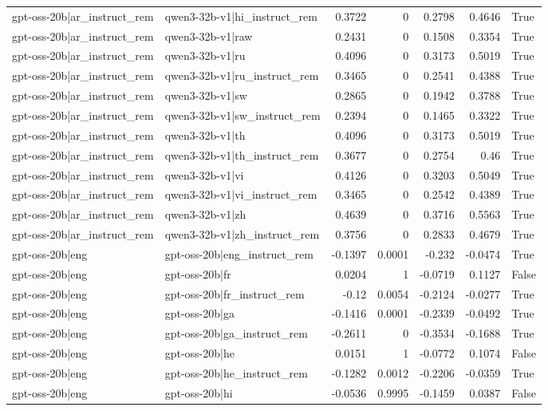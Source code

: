\begin{table}
\begin{tabular}{l l r r r r l}
gpt-oss-20b|ar_instruct_rem & qwen3-32b-v1|hi_instruct_rem & 0.3722 & 0 & 0.2798 & 0.4646 & True \\
gpt-oss-20b|ar_instruct_rem & qwen3-32b-v1|raw & 0.2431 & 0 & 0.1508 & 0.3354 & True \\
gpt-oss-20b|ar_instruct_rem & qwen3-32b-v1|ru & 0.4096 & 0 & 0.3173 & 0.5019 & True \\
gpt-oss-20b|ar_instruct_rem & qwen3-32b-v1|ru_instruct_rem & 0.3465 & 0 & 0.2541 & 0.4388 & True \\
gpt-oss-20b|ar_instruct_rem & qwen3-32b-v1|sw & 0.2865 & 0 & 0.1942 & 0.3788 & True \\
gpt-oss-20b|ar_instruct_rem & qwen3-32b-v1|sw_instruct_rem & 0.2394 & 0 & 0.1465 & 0.3322 & True \\
gpt-oss-20b|ar_instruct_rem & qwen3-32b-v1|th & 0.4096 & 0 & 0.3173 & 0.5019 & True \\
gpt-oss-20b|ar_instruct_rem & qwen3-32b-v1|th_instruct_rem & 0.3677 & 0 & 0.2754 & 0.46 & True \\
gpt-oss-20b|ar_instruct_rem & qwen3-32b-v1|vi & 0.4126 & 0 & 0.3203 & 0.5049 & True \\
gpt-oss-20b|ar_instruct_rem & qwen3-32b-v1|vi_instruct_rem & 0.3465 & 0 & 0.2542 & 0.4389 & True \\
gpt-oss-20b|ar_instruct_rem & qwen3-32b-v1|zh & 0.4639 & 0 & 0.3716 & 0.5563 & True \\
gpt-oss-20b|ar_instruct_rem & qwen3-32b-v1|zh_instruct_rem & 0.3756 & 0 & 0.2833 & 0.4679 & True \\
gpt-oss-20b|eng & gpt-oss-20b|eng_instruct_rem & -0.1397 & 0.0001 & -0.232 & -0.0474 & True \\
gpt-oss-20b|eng & gpt-oss-20b|fr & 0.0204 & 1 & -0.0719 & 0.1127 & False \\
gpt-oss-20b|eng & gpt-oss-20b|fr_instruct_rem & -0.12 & 0.0054 & -0.2124 & -0.0277 & True \\
gpt-oss-20b|eng & gpt-oss-20b|ga & -0.1416 & 0.0001 & -0.2339 & -0.0492 & True \\
gpt-oss-20b|eng & gpt-oss-20b|ga_instruct_rem & -0.2611 & 0 & -0.3534 & -0.1688 & True \\
gpt-oss-20b|eng & gpt-oss-20b|he & 0.0151 & 1 & -0.0772 & 0.1074 & False \\
gpt-oss-20b|eng & gpt-oss-20b|he_instruct_rem & -0.1282 & 0.0012 & -0.2206 & -0.0359 & True \\
gpt-oss-20b|eng & gpt-oss-20b|hi & -0.0536 & 0.9995 & -0.1459 & 0.0387 & False \\

\end{tabular}
\end{table}
